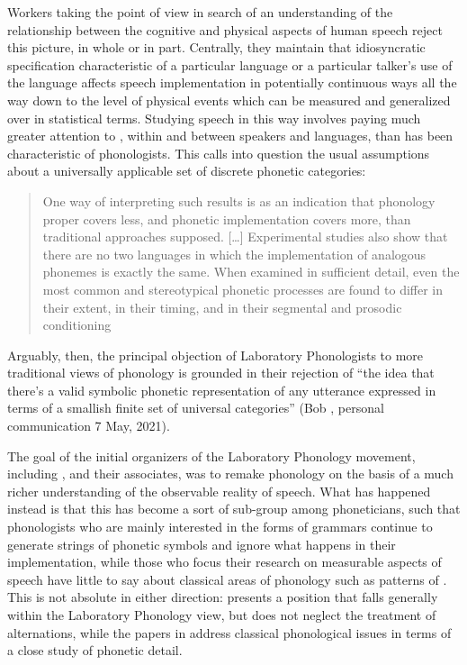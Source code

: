 Workers taking the  point of view in search of an
understanding of the relationship between the cognitive and physical
aspects of human speech reject this picture, in whole or in
part. Centrally, they maintain that idiosyncratic specification
characteristic of a particular language or a particular talker's use
of the language affects speech implementation in potentially
continuous ways all the way down to the level of physical events which
can be measured and generalized over in statistical terms. Studying
speech in this way involves paying much greater attention to
, within and between speakers and languages, than has been
characteristic of phonologists. This calls into question the usual
assumptions about a universally applicable set of discrete phonetic
categories:
\begin{quotation}
  One way of interpreting such results is as an indication that
  phonology proper covers less, and phonetic implementation covers
  more, than traditional approaches supposed. [\ldots] Experimental
  studies also show that there are no two languages in which the
  implementation of analogous phonemes is exactly the same. When
  examined in sufficient detail, even the most common and
  stereotypical phonetic processes are found to differ in their
  extent, in their
  timing, and in their segmental and prosodic conditioning\\
  \citep{pierrehumbert.etal00:labphon}
\end{quotation}
Arguably, then, the principal objection of Laboratory Phonologists to
more traditional views of phonology is grounded in their rejection of ``the
idea that there's a valid symbolic phonetic representation of any
utterance expressed in terms of a smallish finite set of universal
categories'' (Bob {\Ladd}, personal communication 7 May, 2021).

The goal of the initial organizers of the Laboratory Phonology
movement, including ,  and their
associates, was to remake phonology on the basis of a much richer
understanding of the observable reality of speech. What has happened
instead is that this has become a sort of sub-group among
phoneticians, such that phonologists who are mainly interested in the
forms of grammars continue to generate strings of phonetic symbols and
ignore what happens in their implementation, while those who focus
their research on measurable aspects of speech have little to say
about classical areas of phonology such as patterns of .
This is not absolute in either direction: \citet{ladd14:structure}
presents a position that falls generally within the Laboratory
Phonology view, but does not neglect the treatment of alternations,
while the papers in \citet{hayes.etal04:phonetic.phonology} address
classical phonological issues in terms of a close study of phonetic
detail.

